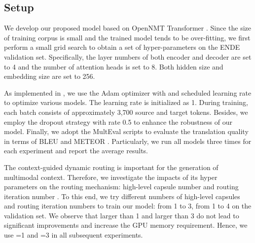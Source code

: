 \documentclass[sigconf]{acmart}
\begin{document}
\subsection{Setup}
We develop our proposed model based on OpenNMT Transformer \cite{klein2017opennmt}.
Since the size of training corpus is small and the trained model tends to be over-fitting, 
we first perform a small grid search to obtain a set of hyper-parameters on the ENDE validation set. Specifically, the layer numbers of both encoder and decoder are set to 4 and the number of attention heads is set to 8. Both hidden size and embedding size are set to 256. 



As implemented in \cite{vaswani2017attention}, we use the Adam optimizer with  and scheduled learning rate to optimize various models. The learning rate is initialized as 1.
During training, each batch consists of approximately 3,700 source and target tokens. Besides, we employ the dropout strategy \cite{srivastava2014dropout} with rate 0.5 to enhance the robustness of our model. Finally, we adopt the MultEval scripts \cite{clark2011better} to evaluate the translation quality in terms of BLEU \cite{papineni2002bleu} and METEOR \cite{denkowski2011meteor}. 
Particularly, we run all models three times for each experiment and report the average results.


The context-guided dynamic routing is important for the generation of multimodal context. 
Therefore, 
we investigate the impacts of its hyper parameters on the routing mechanism: high-level capsule number  and routing iteration number . 
To this end, 
we try different numbers of high-level capsules and routing iteration numbers to train our model:  from 1 to 3,  from 1 to 4 on the validation set. 
We observe that  larger than 1 and  larger than 3 do not lead to significant improvements and increase the GPU memory requirement. 
Hence, we use =1 and =3 in all subsequent experiments.
\end{document}
